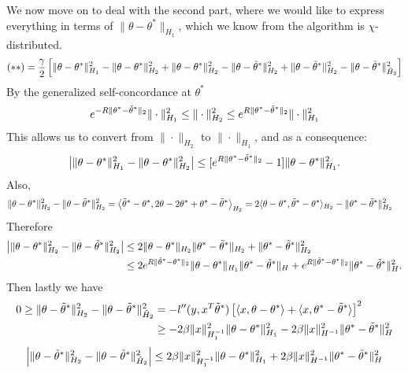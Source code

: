 We now move on to deal with the second part, where we would like to express everything in terms of $\|\theta-\theta^*\|_{H_1}$, which we know from the algorithm is $\chi$-distributed.
\begin{align*}
(**)  = \frac{\gamma}{2}\left[ \|\theta -\theta^*\|_{H_1}^2 - \|\theta -\theta^*\|_{H_2}^2  + \|\theta -\theta^*\|_{H_2}^2 - \|\theta -\tilde{\theta}^*\|_{H_2}^2+ \|\theta -\tilde{\theta}^*\|_{H_2}^2- \|\theta -\tilde{\theta}^*\|_{\tilde{H}_2}^2  \right]
\end{align*}
By the generalized self-concordance at $\theta^*$ %
\begin{align*}
e^{-R\|\theta^*-\tilde{\theta}^*\|_2}\|\cdot\|_{H_1}^2 \leq \|\cdot\|_{H_2}^2 \leq   e^{R\|\theta^*-\tilde{\theta}^*\|_2}\|\cdot\|_{H_1}^2
\end{align*}
This allows us to convert from $\|\cdot\|_{H_2}$ to $\|\cdot\|_{H_1}$, and as a consequence:
$$
\left|\|\theta -\theta^*\|_{H_1}^2 - \|\theta -\theta^*\|_{H_2}^2 \right|  \leq   [e^{R\|\theta^*-\tilde{\theta}^*\|_2} - 1]\|\theta -\theta^*\|_{H_1}^2.
$$
Also, 
\begin{align*}
 \|\theta -\theta^*\|_{H_2}^2 - \|\theta -\tilde{\theta}^*\|_{H_2}^2  &=  \left\langle \tilde{\theta}^* -\theta^* ,  2\theta - 2\theta^* + \theta^*-\tilde{\theta}^*  \right\rangle_{H_2}  =  2 \langle  \theta-\theta^*, \tilde{\theta}^* -\theta^* \rangle_{H_2} -  \|\theta^*-\tilde{\theta}^*\|_{H_2}^2
 \end{align*}
 Therefore
 \begin{align*}
 \left|  \|\theta -\theta^*\|_{H_2}^2 - \|\theta -\tilde{\theta}^*\|_{H_2}^2\right|  &\leq 2\|\theta - \theta^*\|_{H_2} \|\theta^*-\tilde{\theta}^*\|_{H_2}  +  \|\theta^*-\tilde{\theta}^*\|_{H_2}^2  \\
 &\leq 2e^{R\|\tilde{\theta}^* - \theta^*\|_2}\|\theta - \theta^*\|_{H_1} \|\theta^*-\tilde{\theta}^*\|_{H}  + e^{R\|\tilde{\theta}^* - \theta^*\|_2}\|\theta^*-\tilde{\theta}^*\|_{H}^2.
\end{align*}
Then lastly  we have
\begin{align*}
0\geq \|\theta -\tilde{\theta}^*\|_{H_2}^2- \|\theta -\tilde{\theta}^*\|_{\tilde{H}_2}^2 &=  -l''(y,x^T\tilde{\theta}^*)\left[ \langle x, \theta-\theta^* \rangle + \langle x,\theta^*-\tilde{\theta}^*\rangle\right]^2   \\
&\geq -2\beta \|x\|_{H_1^{-1}}^2\|\theta-\theta^*\|_{H_1}^2   -  2\beta \|x\|_{H^{-1}}^2\|\theta^*-\tilde{\theta}^*\|_{H}^2
\end{align*}
$$
\left|  \|\theta -\tilde{\theta}^*\|_{H_2}^2- \|\theta -\tilde{\theta}^*\|_{\tilde{H}_2}^2\right|  \leq 2\beta \|x\|_{H_1^{-1}}^2\|\theta-\theta^*\|_{H_1}^2   +  2\beta \|x\|_{H^{-1}}^2\|\theta^*-\tilde{\theta}^*\|_{H}^2
$$

